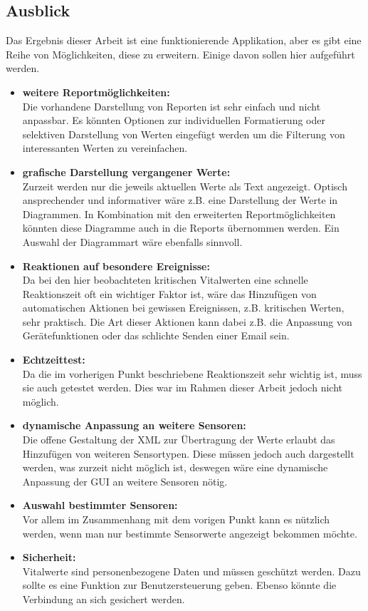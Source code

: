 \subsection{Ausblick}
\label{subsec:Ausblick}
Das Ergebnis dieser Arbeit ist eine funktionierende Applikation, aber es gibt eine Reihe von Möglichkeiten, diese zu erweitern. Einige davon sollen hier aufgeführt werden.

\begin{itemize}
	\item \textbf{weitere Reportmöglichkeiten:} \\
	Die vorhandene Darstellung von Reporten ist sehr einfach und nicht anpassbar. Es könnten Optionen zur individuellen Formatierung oder selektiven Darstellung von Werten eingefügt werden um die Filterung von interessanten Werten zu vereinfachen.
	\item \textbf{grafische Darstellung vergangener Werte:} \\
	Zurzeit werden nur die jeweils aktuellen Werte als Text angezeigt. Optisch ansprechender und informativer wäre z.B. eine Darstellung der Werte in Diagrammen. In Kombination mit den erweiterten Reportmöglichkeiten könnten diese Diagramme auch in die Reports übernommen werden. Ein Auswahl der Diagrammart wäre ebenfalls sinnvoll.
	\item \textbf{Reaktionen auf besondere Ereignisse:} \\
	Da bei den hier beobachteten kritischen Vitalwerten eine schnelle Reaktionszeit oft ein wichtiger Faktor ist, wäre das Hinzufügen von automatischen Aktionen bei gewissen Ereignissen, z.B. kritischen Werten, sehr praktisch. Die Art dieser Aktionen kann dabei z.B. die Anpassung von Gerätefunktionen oder das schlichte Senden einer Email sein.
	\item \textbf{Echtzeittest:} \\
	Da die im vorherigen Punkt beschriebene Reaktionszeit sehr wichtig ist, muss sie auch getestet werden. Dies war im Rahmen dieser Arbeit jedoch nicht möglich. 
	\item \textbf{dynamische Anpassung an weitere Sensoren:} \\
	Die offene Gestaltung der XML zur Übertragung der Werte erlaubt das Hinzufügen von weiteren Sensortypen. Diese müssen jedoch auch dargestellt werden, was zurzeit nicht möglich ist, deswegen wäre eine dynamische Anpassung der GUI an weitere Sensoren nötig. 
	\item \textbf{Auswahl bestimmter Sensoren:} \\
	Vor allem im Zusammenhang mit dem vorigen Punkt kann es nützlich werden, wenn man nur bestimmte Sensorwerte angezeigt bekommen möchte.
	\item \textbf{Sicherheit:} \\
	Vitalwerte sind personenbezogene Daten und müssen geschützt werden. Dazu sollte es eine Funktion zur Benutzersteuerung geben. Ebenso könnte die Verbindung an sich gesichert werden.
\end{itemize}

